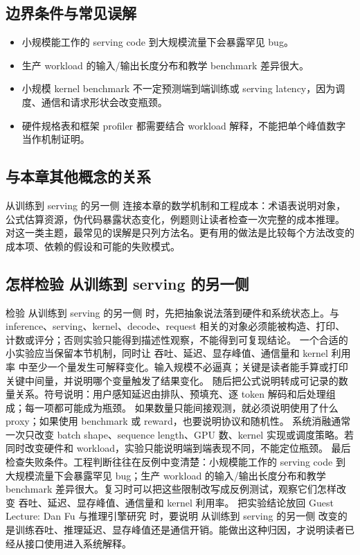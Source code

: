 \documentclass[a4paper]{article}
\begin{document}
\subsection{边界条件与常见误解}
\begin{itemize}
\item 小规模能工作的 serving code 到大规模流量下会暴露罕见 bug。
\item 生产 workload 的输入/输出长度分布和教学 benchmark 差异很大。
\item 小规模 kernel benchmark 不一定预测端到端训练或 serving latency，因为调度、通信和请求形状会改变瓶颈。
\item 硬件规格表和框架 profiler 都需要结合 workload 解释，不能把单个峰值数字当作机制证明。
\end{itemize}
\subsection{与本章其他概念的关系}
从训练到 serving 的另一侧 连接本章的数学机制和工程成本：术语表说明对象，公式估算资源，伪代码暴露状态变化，例题则让读者检查一次完整的成本推理。
对这一类主题，最常见的误解是只列方法名。更有用的做法是比较每个方法改变的成本项、依赖的假设和可能的失败模式。
\subsection{怎样检验 从训练到 serving 的另一侧}
检验 从训练到 serving 的另一侧 时，先把抽象说法落到硬件和系统状态上。与 inference、serving、kernel、decode、request 相关的对象必须能被构造、打印、计数或评分；否则实验只能得到描述性观察，不能得到可复现结论。
一个合适的小实验应当保留本节机制，同时让 吞吐、延迟、显存峰值、通信量和 kernel 利用率 中至少一个量发生可解释变化。输入规模不必逼真；关键是读者能手算或打印关键中间量，并说明哪个变量触发了结果变化。
随后把公式说明转成可记录的数量关系。符号说明：用户感知延迟由排队、预填充、逐 token 解码和后处理组成；每一项都可能成为瓶颈。 如果数量只能间接观测，就必须说明使用了什么 proxy；如果使用 benchmark 或 reward，也要说明协议和随机性。
系统消融通常一次只改变 batch shape、sequence length、GPU 数、kernel 实现或调度策略。若同时改变硬件和 workload，实验只能说明端到端表现不同，不能定位瓶颈。
最后检查失败条件。工程判断往往在反例中变清楚：小规模能工作的 serving code 到大规模流量下会暴露罕见 bug；生产 workload 的输入/输出长度分布和教学 benchmark 差异很大。复习时可以把这些限制改写成反例测试，观察它们怎样改变 吞吐、延迟、显存峰值、通信量和 kernel 利用率。
把实验结论放回 Guest Lecture: Dan Fu 与推理引擎研究 时，要说明 从训练到 serving 的另一侧 改变的是训练吞吐、推理延迟、显存峰值还是通信开销。能做出这种归因，才说明读者已经从接口使用进入系统解释。
\end{document}
